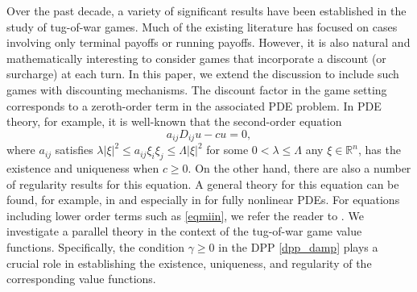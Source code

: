 \documentclass[english]{amsart}
\theoremstyle{plain}
\theoremstyle{definition}
\theoremstyle{remark}
\numberwithin{equation}{section}
\begin{document}
Over the past decade, a variety of significant results have been established in the study of tug-of-war games. 
Much of the existing literature has focused on cases involving only terminal payoffs or running payoffs. 
However, it is also natural and mathematically interesting to consider games that incorporate a discount (or surcharge) at each turn. 
In this paper, we extend the discussion to include such games with discounting mechanisms.
The discount factor in the game setting corresponds to a zeroth-order term in the associated PDE problem.
In PDE theory, for example, it is well-known that the second-order equation
$$ a_{ij}D_{ij} u - cu =0, $$
where $a_{ij}$ satisfies $ \lambda |\xi|^2 \le a_{ij}\xi_i \xi_j \le \Lambda |\xi|^2 $ for some $0<\lambda\le \Lambda$ any $\xi \in \mathbb{R}^n$,
has the existence and uniqueness when $c\ge0$. On the other hand, there are also a number of regularity results for this equation.
A general theory for this equation can be found, for example, in \cite{MR737190,MR2777537} and especially in \cite{MR1118699,MR1351007} for fully nonlinear PDEs. For equations including lower order terms such as \eqref{eqmiin}, we refer the reader to \cite{MR1376656,MR1606359}.
We investigate a parallel theory in the context of the tug-of-war game value functions.
Specifically, the condition $\gamma \ge0$ in the DPP \eqref{dpp_damp} plays a crucial role in establishing the existence, uniqueness, and regularity of the corresponding value functions.
\end{document}
